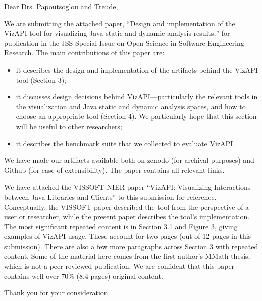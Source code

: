 \documentclass{letter}
\begin{document}
\begin{letter}{}
\opening{Dear Drs. Papoutsoglou and Treude,}

We are submitting the attached paper, ``Design and implementation of the VizAPI tool for visualizing Java static and dynamic analysis results,'' for publication in the JSS Special Issue on Open Science in Software Engineering Research. The main contributions of this paper are:
\begin{itemize}
\item it describes the design and implementation of the artifacts behind the VizAPI tool (Section 3);
\item it discusses design decisions behind VizAPI---particularly the relevant tools in the visualization and Java static and dynamic analysis spaces, and how to choose an appropriate tool (Section 4).
We particularly hope that this section will be useful to other researchers;
\item it describes the benchmark suite that we collected to evaluate VizAPI.
\end{itemize}

We have made our artifacts available both on zenodo (for archival
purposes) and Github (for ease of extensibility). The paper contains
all relevant links.

We have attached the VISSOFT NIER paper ``VizAPI: Visualizing
Interactions between Java Libraries and Clients'' to this submission
for reference. Conceptually, the VISSOFT paper described the tool from
the perspective of a user or researcher, while the present paper describes the tool's
implementation. The most significant repeated content is in Section
3.1 and Figure 3, giving examples of VizAPI usage. These account for
two pages (out of 12 pages in this submission). There are also a few
more paragraphs across Section 3 with repeated content. Some of the
material here comes from the first author's MMath thesis, which is
not a peer-reviewed publication. We are confident that this paper
contains well over 70\% (8.4 pages) original content.

\closing{Thank you for your consideration.}

%
%

\end{letter} 
\end{document}
